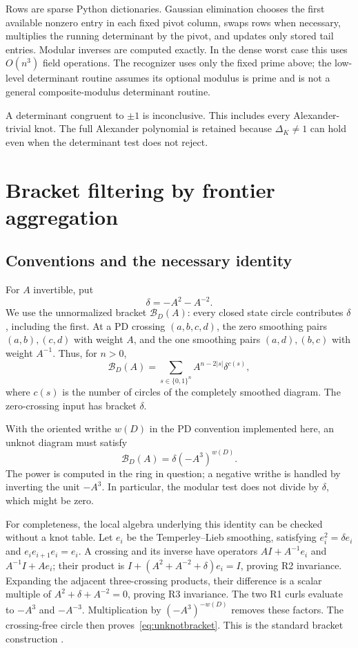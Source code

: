 \documentclass[11pt]{article}
\theoremstyle{remark}\newtheorem{remark}[theorem]{Remark}
\begin{document}
Rows are sparse Python dictionaries. Gaussian elimination chooses the first
available nonzero entry in each fixed pivot column, swaps rows when necessary,
multiplies the running determinant by the pivot, and updates only stored tail
entries. Modular inverses are computed exactly. In the dense worst case this
uses $O(n^3)$ field operations. The recognizer uses only the fixed prime above;
the low-level determinant routine assumes its optional modulus is prime and
is not a general composite-modulus determinant routine.

A determinant congruent to $\pm1$ is inconclusive. This includes every
Alexander-trivial knot. The full Alexander polynomial is retained because
$\Delta_K\ne1$ can hold even when the determinant test does not reject.

\section{Bracket filtering by frontier aggregation}
\label{sec:bracket}
\subsection{Conventions and the necessary identity}
For $A$ invertible, put
\begin{equation}
 \delta=-A^2-A^{-2}.
\end{equation}
We use the unnormalized bracket $\mathcal B_D(A)$: every closed state circle
contributes $\delta$, including the first. At a PD crossing $(a,b,c,d)$, the
zero smoothing pairs $(a,b),(c,d)$ with weight $A$, and the one smoothing pairs
$(a,d),(b,c)$ with weight $A^{-1}$. Thus, for $n>0$,
\begin{equation}
 \mathcal B_D(A)=\sum_{s\in\{0,1\}^n}A^{n-2|s|}\delta^{c(s)},
 \label{eq:statesum}
\end{equation}
where $c(s)$ is the number of circles of the completely smoothed diagram.
The zero-crossing input has bracket $\delta$.

With the oriented writhe $w(D)$ in the PD convention implemented here, an
unknot diagram must satisfy
\begin{equation}
 \mathcal B_D(A)=\delta(-A^3)^{w(D)}.
 \label{eq:unknotbracket}
\end{equation}
The power is computed in the ring in question; a negative writhe is handled by
inverting the unit $-A^3$. In particular, the modular test does not divide by
$\delta$, which might be zero.

For completeness, the local algebra underlying this identity can be checked
without a knot table. Let $e_i$ be the Temperley--Lieb smoothing, satisfying
$e_i^2=\delta e_i$ and $e_ie_{i+1}e_i=e_i$. A crossing and its inverse have
operators $AI+A^{-1}e_i$ and $A^{-1}I+Ae_i$; their product is
$I+(A^2+A^{-2}+\delta)e_i=I$, proving R2 invariance. Expanding the adjacent
three-crossing products, their difference is a scalar multiple of
$A^2+\delta+A^{-2}=0$, proving R3 invariance. The two R1 curls evaluate to
$-A^3$ and $-A^{-3}$. Multiplication by $(-A^3)^{-w(D)}$ removes these factors.
The crossing-free circle then proves~\eqref{eq:unknotbracket}. This is the
standard bracket construction \cite{Kauffman}.
\end{document}
